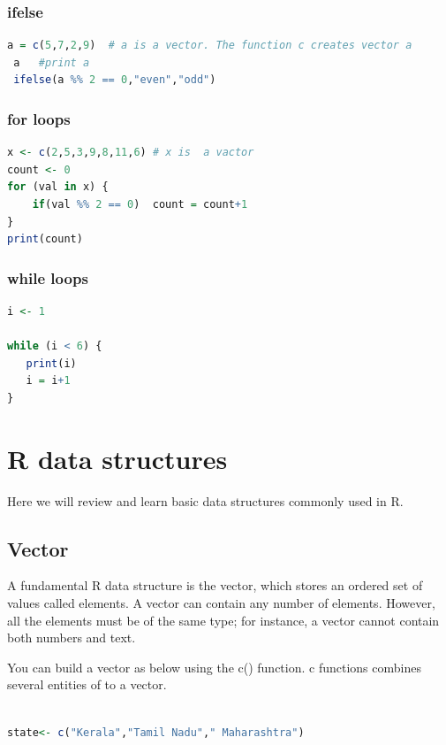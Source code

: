 \documentclass["../Applied_probabillity _and_statistics_lab_KTU.tex"]{subfiles}
\begin{document}
 \subsubsection*{ifelse}
 
    \begin{lstlisting}[language=R]
 a = c(5,7,2,9)  # a is a vector. The function c creates vector a
 a   #print a  
 ifelse(a %% 2 == 0,"even","odd")

\end{lstlisting}

 \subsubsection*{for loops}
    \begin{lstlisting}[language=R]
 x <- c(2,5,3,9,8,11,6) # x is  a vactor 
count <- 0
for (val in x) {
    if(val %% 2 == 0)  count = count+1
}
print(count)

\end{lstlisting}
 \subsubsection*{while loops}
    \begin{lstlisting}[language=R]
 i <- 1

while (i < 6) {
   print(i)
   i = i+1
}

\end{lstlisting}
 
 \section{R data structures}
 

Here we will review and learn basic data structures commonly used in R.
\subsection{Vector}


A fundamental R data structure is the vector, which stores an ordered set of values called elements. A vector can contain any number of elements. However, all the elements must be of the same type; for instance, a vector cannot contain both numbers and text.

You can build a vector as below using the c() function. c functions combines several entities of to a vector.
   
    \begin{lstlisting}[language=R]
 
state<- c("Kerala","Tamil Nadu"," Maharashtra")

\end{lstlisting}
 
\end{document}
